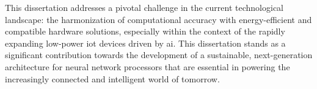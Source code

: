 This dissertation addresses a pivotal challenge in the current technological landscape: the harmonization of computational accuracy with energy-efficient and compatible hardware solutions, especially within the context of the rapidly expanding low-power \gls{iot} devices driven by \gls{ai}. This dissertation stands as a significant contribution towards the development of a sustainable, next-generation architecture for neural network processors that are essential in powering the increasingly connected and intelligent world of tomorrow.